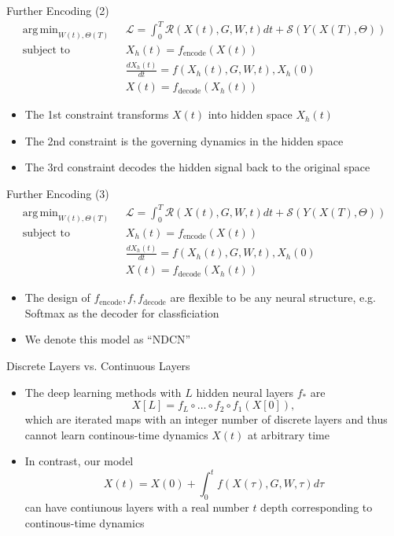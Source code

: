 \documentclass{beamer}
\DeclareMathOperator*{\argmin}{arg\,min}
\begin{document}
\begin{frame}{Further Encoding (2)}
\[
\begin{split}
\argmin_{W(t),\Theta(T)}\text{ }&\mathcal{L}=\int_0^T\mathcal{R}\left(X(t),G,W,t\right)dt+\mathcal{S}\left(Y(X(T),\Theta)\right)\\
\text{subject to }&X_h(t)=f_\text{encode}(X(t))\\
&\frac{dX_h(t)}{dt}=f(X_h(t),G,W,t),X_h(0)\\
&X(t)=f_\text{decode}(X_h(t))
\end{split}
\]
\begin{itemize}
\item The 1st constraint transforms $X(t)$ into hidden space $X_h(t)$
\item The 2nd constraint is the governing dynamics in the hidden space
\item The 3rd constraint decodes the hidden signal back to the original space
\end{itemize}
\end{frame}

\begin{frame}{Further Encoding (3)}
\[
\begin{split}
\argmin_{W(t),\Theta(T)}\text{ }&\mathcal{L}=\int_0^T\mathcal{R}\left(X(t),G,W,t\right)dt+\mathcal{S}\left(Y(X(T),\Theta)\right)\\
\text{subject to }&X_h(t)=f_\text{encode}(X(t))\\
&\frac{dX_h(t)}{dt}=f(X_h(t),G,W,t),X_h(0)\\
&X(t)=f_\text{decode}(X_h(t))
\end{split}
\]
\begin{itemize}
\item The design of $f_\text{encode}, f, f_\text{decode}$ are flexible to be any neural structure, e.g. Softmax as the decoder for classficiation
\item We denote this model as ``NDCN''
\end{itemize}
\end{frame}

\begin{frame}{Discrete Layers vs. Continuous Layers}
\begin{itemize}
\item The deep learning methods with $L$ hidden neural layers $f_*$ are\[
X[L]=f_L\circ\dots\circ f_2\circ f_1(X[0]),
\]which are iterated maps with an integer number of discrete layers and thus cannot learn continous-time dynamics $X(t)$ at arbitrary time
\item In contrast, our model\[
X(t)=X(0)+\int_0^t f(X(\tau),G,W,\tau)d\tau
\]can have contiunous layers with a real number $t$ depth corresponding to continous-time dynamics
\end{itemize}
\end{frame}
\end{document}
